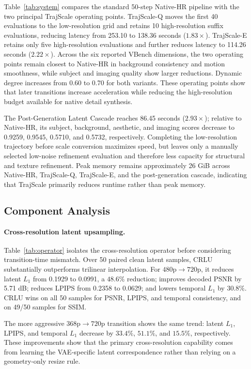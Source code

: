 Table~\ref{tab:system} compares the standard 50-step Native-HR pipeline with
the two principal TrajScale operating points. TrajScale-Q moves the first 40
evaluations to the low-resolution grid and retains 10 high-resolution suffix
evaluations, reducing latency from 253.10 to 138.36 seconds
(\(1.83\times\)). TrajScale-E retains only five high-resolution evaluations and
further reduces latency to 114.26 seconds (\(2.22\times\)). Across the six
reported VBench dimensions, the two operating points remain closest to
Native-HR in background consistency and motion smoothness, while subject and
imaging quality show larger reductions. Dynamic degree increases from 0.60 to
0.70 for both variants. These operating points show that later transitions
increase acceleration while reducing the high-resolution budget available for
native detail synthesis.

The Post-Generation Latent Cascade reaches 86.45 seconds
(\(2.93\times\)); relative to Native-HR, its subject, background, aesthetic,
and imaging scores decrease to 0.9259, 0.9545, 0.5710, and 0.5732,
respectively. Completing the
low-resolution trajectory before scale conversion maximizes speed, but leaves
only a manually selected low-noise refinement evaluation and therefore less
capacity for structural and texture refinement. Peak memory remains
approximately 26 GiB across Native-HR, TrajScale-Q, TrajScale-E, and the
post-generation cascade, indicating that TrajScale primarily reduces runtime
rather than peak memory.

\subsection{Component Analysis}

\paragraph{Cross-resolution latent upsampling.}
Table~\ref{tab:operator} isolates the cross-resolution operator before
considering transition-time mismatch. Over 50 paired clean latent samples,
CRLU substantially outperforms trilinear interpolation. For
\(480\text{p}\rightarrow720\text{p}\), it reduces latent \(L_1\) from
0.1929 to 0.0991, a \(48.6\%\) reduction; improves decoded PSNR by 5.71 dB;
reduces LPIPS from 0.2358 to 0.0629; and lowers temporal \(L_1\) by
\(30.8\%\). CRLU wins on all 50 samples for PSNR, LPIPS, and temporal
consistency, and on 49/50 samples for SSIM.

The more aggressive \(368\text{p}\rightarrow720\text{p}\) transition
shows the same trend: latent \(L_1\), LPIPS, and temporal \(L_1\) decrease by
\(33.4\%\), \(51.1\%\), and \(15.5\%\), respectively. These improvements
show that the primary cross-resolution capability comes from learning the
VAE-specific latent correspondence rather than relying on a geometry-only
resize rule.

